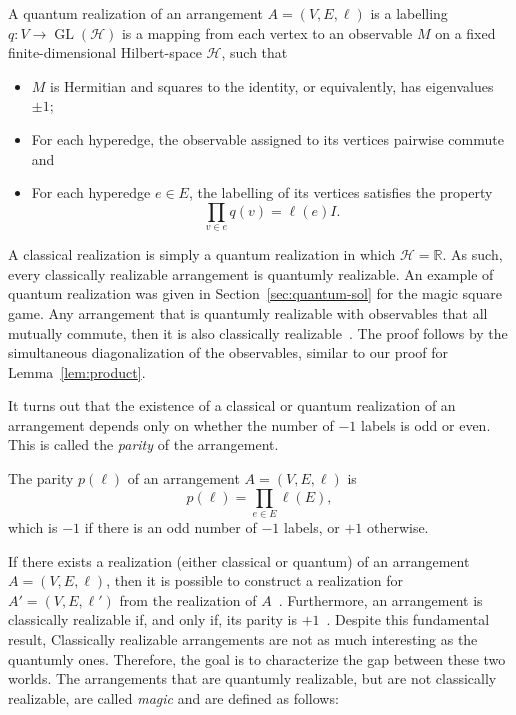 \documentclass{llncs}
\begin{document}
\begin{definition}\label{def:quantum-re}
  A quantum realization of an arrangement \(A = (V, E, \ell)\) is a
  labelling \(q\colon V \to \operatorname{GL}(\mathcal{H})\) is a
  mapping from each vertex to an observable \(M\) on a fixed
  finite-dimensional Hilbert-space \(\mathcal{H}\), such that
  \begin{itemize}
  \item \(M\) is Hermitian and squares to the identity, or
    equivalently, has eigenvalues \(\pm{}1\);
    
  \item For each hyperedge, the observable assigned to its vertices
    pairwise commute and
    
  \item For each hyperedge \(e \in E\), the labelling of its vertices
    satisfies the property
    \[
      \prod_{v \in e} q(v) = \ell(e) I.
    \]
  \end{itemize}
\end{definition}

A classical realization is simply a quantum realization in which
\(\mathcal{H} = \mathbb{R}\). As such, every classically realizable
arrangement is quantumly realizable. An example of quantum realization
was given in Section~\ref{sec:quantum-sol} for the magic square game.
Any arrangement that is quantumly realizable with observables that all
mutually commute, then it is also classically
realizable~\cite[Proposition 8]{arkhipov2012}. The proof follows by
the simultaneous diagonalization of the observables, similar to our
proof for Lemma~\ref{lem:product}.

It turns out that the existence of a classical or quantum realization
of an arrangement depends only on whether the number of \(-1\) labels
is odd or even. This is called the \emph{parity} of the arrangement.

\begin{definition}\label{def:parity}
  The parity \(p(\ell)\) of an arrangement \(A = (V, E, \ell)\) is
  \[
    p(\ell) = \prod_{e \in E} \ell(E),
  \]
  which is \(-1\) if there is an odd number of \(-1\) labels, or \(+1\) otherwise.
\end{definition}

If there exists a realization (either classical or quantum) of an
arrangement \(A = (V, E, \ell)\), then it is possible to construct a
realization for \(A' = (V, E, \ell')\) from the realization of
\(A\)~\cite[Propositions 10 and 12]{arkhipov2012}. Furthermore, an
arrangement is classically realizable if, and only if, its parity is
\(+1\)~\cite[Proposition 11]{arkhipov2012}. Despite this fundamental result,
Classically realizable arrangements are not as much interesting as the
quantumly ones. Therefore, the goal is to characterize the gap between
these two worlds. The arrangements that are quantumly realizable, but
are not classically realizable, are called \emph{magic} and are
defined as follows:
\end{document}
